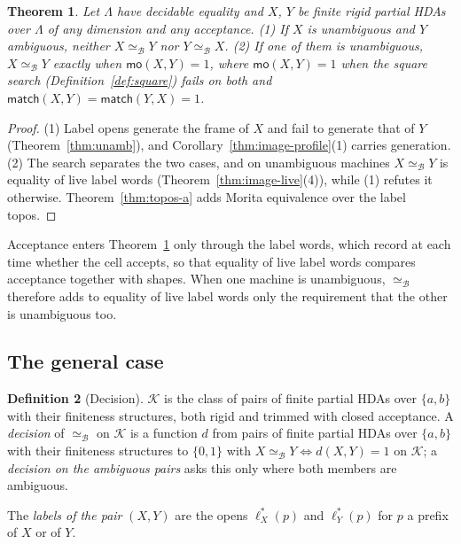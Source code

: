 \documentclass{lmcs}
\newtheorem{theorem}{Theorem}[section]
\theoremstyle{definition}
\newtheorem{definition}[theorem]{Definition}
\theoremstyle{remark}
\newcommand{\ab}{\{a,b\}}
\providecommand{\matchB}{\mathsf{match}}
\providecommand{\moB}{\mathsf{mo}}
\providecommand{\Cls}{\mathcal{K}}
\providecommand{\eqB}{\simeq_{\mathcal{B}}}
\providecommand{\lst}[1]{\ell^{*}_{#1}}
\begin{document}
\begin{theorem}\label{thm:dec-morita-inj}
Let $\Lambda$ have decidable equality and $X$, $Y$ be finite rigid partial HDAs over $\Lambda$ of any dimension and any
acceptance.
(1) If $X$ is unambiguous and $Y$ ambiguous, neither $X\eqB Y$ nor $Y\eqB X$.
(2) If one of them is unambiguous, $X\eqB Y$ exactly when $\moB(X,Y)=1$, where $\moB(X,Y)=1$ when the square search
(Definition~\ref{def:square}) fails on both and
$\matchB(X,Y)=\matchB(Y,X)=1$.
\end{theorem}

\begin{proof}
(1) Label opens generate the frame of $X$ and fail to generate that of $Y$ (Theorem~\ref{thm:unamb}), and
Corollary~\ref{thm:image-profile}(1) carries generation. (2) The search
separates the two cases, and on unambiguous machines $X\eqB Y$ is equality
of live label words (Theorem~\ref{thm:image-live}(4)), while (1) refutes it otherwise. Theorem~\ref{thm:topos-a}
adds Morita equivalence over the label topos.
\end{proof}

Acceptance enters Theorem~\ref{thm:dec-morita-inj} only through the label words, which record at each time
whether the cell accepts, so that equality of live label words compares acceptance together with shapes. When one machine
is unambiguous, $\eqB$ therefore adds to equality of live label words only the requirement that the other is
unambiguous too.

\subsection{The general case}\label{ssec:decide-game}

\begin{definition}[Decision]\label{def:decision}
$\Cls$ is the class of pairs of finite partial HDAs over $\ab$ with their finiteness structures, both rigid and trimmed
with closed acceptance. A \emph{decision} of $\eqB$ on $\Cls$ is a function $d$ from pairs of finite partial HDAs over
$\ab$ with their finiteness structures to $\{0,1\}$ with $X\eqB Y\iff d(X,Y)=1$ on $\Cls$; a \emph{decision on the
ambiguous pairs} asks this only where both members are ambiguous.
\end{definition}

The \emph{labels of the pair} $(X,Y)$ are the opens $\lst{X}(p)$ and $\lst{Y}(p)$ for $p$ a prefix of $X$ or of $Y$.
\end{document}

